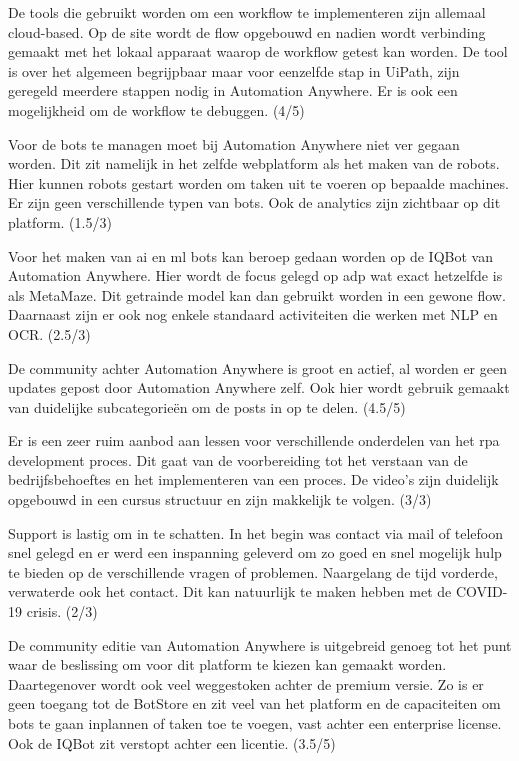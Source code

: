 De tools die gebruikt worden om een \gls{workflow} te implementeren zijn allemaal cloud-based. Op de site wordt de flow opgebouwd en nadien wordt verbinding gemaakt met het lokaal apparaat waarop de \gls{workflow} getest kan worden. De tool is over het algemeen begrijpbaar maar voor eenzelfde stap in UiPath, zijn geregeld meerdere stappen nodig in Automation Anywhere. Er is ook een mogelijkheid om de \gls{workflow} te debuggen. (4/5)

Voor de bots te managen moet bij Automation Anywhere niet ver gegaan worden. Dit zit namelijk in het zelfde webplatform als het maken van de robots. Hier kunnen robots gestart worden om taken uit te voeren op bepaalde machines. Er zijn geen verschillende typen van bots. Ook de analytics zijn zichtbaar op dit platform. (1.5/3)

Voor het maken van \acrshort{ai} en \acrshort{ml} bots kan beroep gedaan worden op de IQBot van Automation Anywhere. Hier wordt de focus gelegd op \acrfull{adp} wat exact hetzelfde is als MetaMaze. Dit getrainde model kan dan gebruikt worden in een gewone flow. Daarnaast zijn er ook nog enkele standaard \gls{activiteit}en die werken met NLP en OCR. (2.5/3)

De community achter Automation Anywhere is groot en actief, al worden er geen updates gepost door Automation Anywhere zelf. Ook hier wordt gebruik gemaakt van duidelijke subcategorieën om de posts in op te delen. (4.5/5) 

Er is een zeer ruim aanbod aan lessen voor verschillende onderdelen van het \acrshort{rpa} development proces. Dit gaat van de voorbereiding tot het verstaan van de bedrijfsbehoeftes en het implementeren van een proces. De video's zijn duidelijk opgebouwd in een cursus structuur en zijn makkelijk te volgen. (3/3)

Support is lastig om in te schatten. In het begin was contact via mail of telefoon snel gelegd en er werd een inspanning geleverd om zo goed en snel mogelijk hulp te bieden op de verschillende vragen of problemen. Naargelang de tijd vorderde, verwaterde ook het contact. Dit kan natuurlijk te maken hebben met de COVID-19 crisis. (2/3)

De community editie van Automation Anywhere is uitgebreid genoeg tot het punt waar de beslissing om voor dit platform te kiezen kan gemaakt worden. Daartegenover wordt ook veel weggestoken achter de premium versie. Zo is er geen toegang tot de BotStore en zit veel van het platform en de capaciteiten om bots te gaan inplannen of taken toe te voegen, vast achter een enterprise license. Ook de IQBot zit verstopt achter een licentie. (3.5/5)

